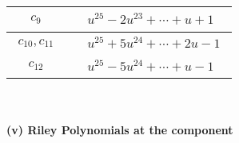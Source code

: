 \documentclass[1p]{elsarticle_modified}
\theoremstyle{definition}
\begin{document}
\begin{tabular}{m{50pt}|m{274pt}}
\hline $$\begin{aligned}c_{9}\end{aligned}$$&$\begin{aligned}
&u^{25}-2 u^{23}+\cdots+u+1
\end{aligned}$\\
\hline $$\begin{aligned}c_{10},c_{11}\end{aligned}$$&$\begin{aligned}
&u^{25}+5 u^{24}+\cdots+2 u-1
\end{aligned}$\\
\hline $$\begin{aligned}c_{12}\end{aligned}$$&$\begin{aligned}
&u^{25}-5 u^{24}+\cdots+u-1
\end{aligned}$\\
\hline
\end{tabular}\\~\\
\newpage\renewcommand{\arraystretch}{1}
\flushleft \textbf{(v) Riley Polynomials at the component}\newline \\
\end{document}
